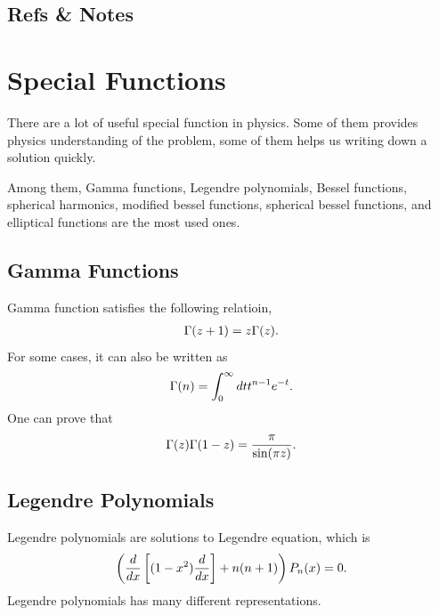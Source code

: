 \documentclass[letterpaper,10pt,english]{sphinxmanual}
\begin{document}
\subsection{Refs \& Notes}
\label{math:refs-notes}

\section{Special Functions}
\label{special-functions:special-functions}\label{special-functions::doc}
There are a lot of useful special function in physics. Some of them provides physics understanding of the problem, some of them helps us writing down a solution quickly.

Among them, Gamma functions, Legendre polynomials, Bessel functions, spherical harmonics, modified bessel functions, spherical bessel functions, and elliptical functions are the most used ones.


\subsection{Gamma Functions}
\label{special-functions:gamma-functions}
Gamma function satisfies the following relatioin,
\begin{gather}
\begin{split}\Gamma(z+1) = z\Gamma(z) .\end{split}\notag
\end{gather}
For some cases, it can also be written as
\begin{gather}
\begin{split}\Gamma(n) = \int_0^\infty dt t^{n-1} e^{-t} .\end{split}\notag
\end{gather}
One can prove that
\begin{gather}
\begin{split}\Gamma(z)\Gamma(1-z) = \frac{\pi}{\sin(\pi z)} .\end{split}\notag
\end{gather}

\subsection{Legendre Polynomials}
\label{special-functions:legendre-polynomials}
Legendre polynomials are solutions to Legendre equation, which is
\begin{gather}
\begin{split}\left(\frac{d}{dx}\left[(1-x^2)\frac{d}{dx}\right] + n(n+1)\right) P_n(x) = 0.\end{split}\notag
\end{gather}
Legendre polynomials has many different representations.
\end{document}
